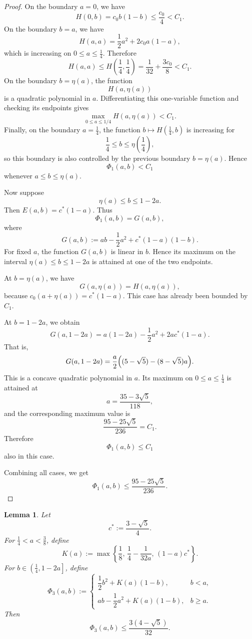 \documentclass[runningheads,envcountsame,a4paper]{llncs}
\newtheorem{lem}[thm]{Lemma}
\begin{document}
\begin{proof}
On the boundary \(a=0\), we have
\[
H(0,b)=c_0b(1-b)\leq \frac{c_0}{4}<C_1.
\]
On the boundary \(b=a\), we have
\[
H(a,a)=\frac12a^2+2c_0a(1-a),
\]
which is increasing on \(0\leq a\leq \frac14\). Therefore
\[
H(a,a)\leq H\left(\frac14,\frac14\right)
=
\frac1{32}+\frac{3c_0}{8}
<C_1.
\]
On the boundary \(b=\eta(a)\), the function
\[
H(a,\eta(a))
\]
is a quadratic polynomial in \(a\). Differentiating this one-variable function
and checking its endpoints gives
\[
\max_{0\leq a\leq 1/4} H(a,\eta(a))<C_1.
\]
Finally, on the boundary \(a=\frac14\), the function
\(b\mapsto H(\frac14,b)\) is increasing for
\[
\frac14\leq b\leq \eta\left(\frac14\right),
\]
so this boundary is also controlled by the previous boundary
\(b=\eta(a)\). Hence
\[
\Phi_1(a,b)<C_1
\]
whenever \(a\leq b\leq \eta(a)\).

Now suppose
\[
\eta(a)\leq b\leq 1-2a.
\]
Then \(E(a,b)=c^*(1-a)\). Thus
\[
\Phi_1(a,b)=G(a,b),
\]
where
\[
G(a,b):=
ab-\frac12a^2+c^*(1-a)(1-b).
\]
For fixed \(a\), the function \(G(a,b)\) is linear in \(b\). Hence its maximum
on the interval \(\eta(a)\leq b\leq 1-2a\) is attained at one of the two endpoints.

At \(b=\eta(a)\), we have
\[
G(a,\eta(a))=H(a,\eta(a)),
\]
because \(c_0(a+\eta(a))=c^*(1-a)\). This case has already been bounded by
\(C_1\).

At \(b=1-2a\), we obtain
\[
G(a,1-2a)
=
a(1-2a)-\frac12a^2+2ac^*(1-a).
\]
That is,
\[
G(a,1-2a)
=
\frac a2\Bigl((5-\sqrt5)-(8-\sqrt5)a\Bigr).
\]
This is a concave quadratic polynomial in \(a\). Its maximum on
\(0\leq a\leq \frac14\) is attained at
\[
a=\frac{35-3\sqrt5}{118},
\]
and the corresponding maximum value is
\[
\frac{95-25\sqrt5}{236}=C_1.
\]
Therefore
\[
\Phi_1(a,b)\leq C_1
\]
also in this case.

Combining all cases, we get
\[
\Phi_1(a,b)\leq \frac{95-25\sqrt5}{236}.
\]
\end{proof}


\begin{lem}\label{lem:optimization-case3}
Let
\[
c^*:=\frac{3-\sqrt5}{4}.
\]
For \(\frac14<a<\frac38\), define
\[
K(a):=
\max\left\{
\frac18,\,
\frac14-\frac1{32a},\,
(1-a)c^*
\right\}.
\]
For \(b\in\left(\frac14,1-2a\right]\), define
\[
\Phi_3(a,b):=
\begin{cases}
\dfrac12 b^2+K(a)(1-b), & b<a,\\[6pt]
ab-\dfrac12a^2+K(a)(1-b), & b\geq a.
\end{cases}
\]
Then
\[
\Phi_3(a,b)\leq \frac{3(4-\sqrt5)}{32}.
\]
\end{lem}
\end{document}
